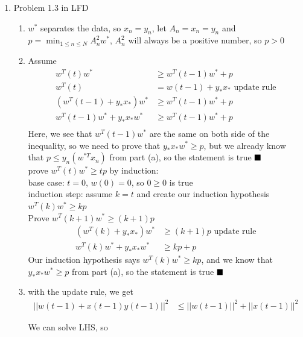 \documentclass{article}
\begin{document}
\begin{enumerate}
        \item Problem 1.3 in LFD
        \begin{enumerate}[label=(\alph*)]
            \item $w^*$ separates the data, so $x_n = y_n$, let $A_n = x_n = y_n$ and $p = \min_{1 \leq n \leq N} A^2_nw^*$, $A^2_n$ will always be a positive number, so $p>0$
            \item Assume
            \begin{align*}
                w^T(t)w^* &\geq w^T(t-1)w^* + p\\
                w^T(t) &= w(t-1) + y_*x_* \text{ update rule}\\
                (w^T(t-1) + y_*x_*)w^* &\geq w^T(t-1)w^* + p\\
                w^T(t-1)w^* + y_*x_*w^* &\geq w^T(t-1)w^* + p\\
            \end{align*}
                Here, we see that $w^T(t-1)w^*$ are the same on both side of the inequality, so we need to prove that $y_*x_*w^* \geq p$, but we already know that $p \leq y_n(w^{*T}x_n)$ from part (a), so the statement is true $\hfill \blacksquare$
                \\[0.25in] prove $w^T(t)w^* \geq tp$ by induction:\\
                base case: $t=0$, $w(0) = 0$, so $0\geq0$ is true\\
                induction step: assume $k=t$ and create our induction hypothesis $w^T(k)w^* \geq kp$\\
                Prove $w^T(k+1)w^* \geq (k+1)p$
                \begin{align*}
                    (w^T(k) + y_*x_*)w^* &\geq (k+1)p \text{ update rule}\\
                    w^T(k)w^* + y_*x_*w^* &\geq kp + p
                \end{align*}
                Our induction hypothesis says $w^T(k)w^* \geq kp$, and we know that $y_*x_*w^* \geq p$ from part (a), so the statement is true $\hfill \blacksquare$
            
            \item with the update rule, we get
            \begin{align*}
                ||w(t-1) + x(t-1)y(t-1)||^2 &\leq ||w(t-1)||^2 + ||x(t-1)||^2
            \end{align*}
            \begin{center}
                We can solve LHS, so
            \end{center}


\end{enumerate}
\end{enumerate}
\end{document}
